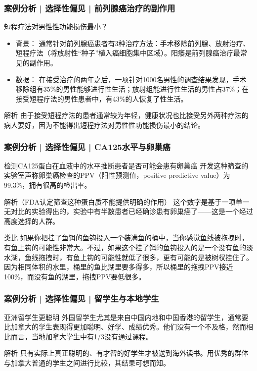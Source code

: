 \begin{frame}
  \frametitle{案例分析 | 选择性偏见 | 前列腺癌治疗的副作用}
  \begin{block}{短程疗法对男性性功能损伤最小？}
    \begin{itemize}
      \item 背景：
通常针对前列腺癌患者有3种治疗方法：手术移除前列腺、放射治疗、短程疗法（将放射性“种子”植入癌细胞集中区域）。阳痿是前列腺癌治疗最常见的副作用。
      \item 数据： 在接受治疗的两年之后，一项针对1000名男性的调查结果发现，手术移除组有35\%的男性能够进行性生活；放射组能进行性生活的男性占37\%；在接受短程疗法的男性患者中，有43\%的人恢复了性生活。
    \end{itemize}
  \end{block}
  \pause
  \begin{block}{解析}
    由于接受短程疗法的患者通常较为年轻，健康状况也比接受另外两种疗法的病人要好，因为不能得出短程疗法对男性性功能损伤最小的结论。
  \end{block}
\end{frame}

\begin{frame}
  \frametitle{案例分析 | 选择性偏见 | CA125水平与卵巢癌}
  \begin{block}{检测CA125蛋白在血液中的水平推断患者是否可能会患有卵巢癌}
    开发这种筛查的实验室声称卵巢癌检查的PPV（阳性预测值，positive predictive value）为99.3\%，拥有很高的检出率。
  \end{block}
  \pause
  \vspace{-0.3em}
  \begin{block}{解析（FDA认定筛查这种蛋白质不能提供明确的作用）}
    这个数字是基于一项单一无对比的实验得出的，实验中有半数患者已经确诊患有卵巢癌了——这是一个经过高度选择的人群。
  \end{block}
  \pause
  \vspace{-0.3em}
  \begin{block}{类比}
    如果你把挂了鱼饵的鱼钩投入一个装满鱼的桶中，当你感觉鱼线被拖拽时，有鱼上钩的可能性非常大。不过，如果这个挂了饵的鱼钩投入的是一个没有鱼的淡水湖，鱼线拖拽时，有鱼上钩的可能性就低了很多，更有可能的是被树杈挂住了。因为相同体积的水里，桶里的鱼比湖里要多得多，所以桶里的拖拽PPV接近100\%，而没有鱼的湖里，拖拽PPV要低很多。
  \end{block}
\end{frame}

\begin{frame}
  \frametitle{案例分析 | 选择性偏见 | 留学生与本地学生}
  \begin{block}{亚洲留学生更聪明}
    外国留学生尤其是来自中国内地和中国香港的留学生，通常要比加拿大的学生表现得更加聪明、好学、成绩优秀。他们没有一个不及格，然而相比而言，当地加拿大学生中有1/3没有通过课程。
  \end{block}
  \pause
  \begin{block}{解析}
    只有实际上真正聪明的、有才智的好学生才被送到海外读书。用优秀的群体与加拿大普通的学生之间进行比较，其结果可想而知。
  \end{block}
\end{frame}

